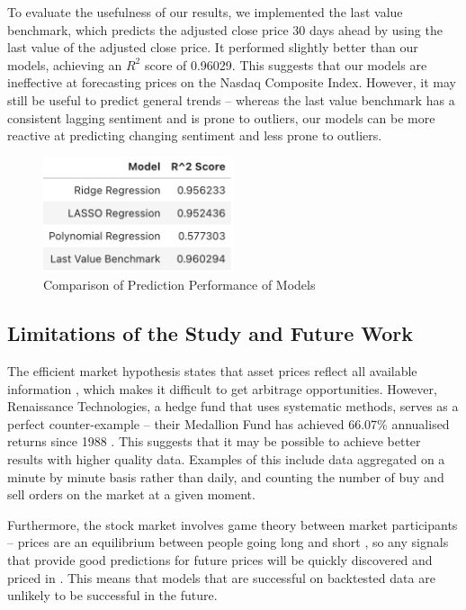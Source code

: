 \documentclass[a4paper, 11pt]{article}
\begin{document}
To evaluate the usefulness of our results, we implemented the last value benchmark, which predicts the adjusted close price 30 days ahead by using the last value of the adjusted close price. It performed slightly better than our models, achieving an $R^2$ score of 0.96029. This suggests that our models are ineffective at forecasting prices on the Nasdaq Composite Index. However, it may still be useful to predict general trends -- whereas the last value benchmark has a consistent lagging sentiment and is prone to outliers, our models can be more reactive at predicting changing sentiment and less prone to outliers.

\begin{figure}[H]
    \begin{center}
        \includegraphics[width=0.5\textwidth]{Model Results Table.png}
        \caption{Comparison of Prediction Performance of Models}
    \end{center}
\end{figure}

\subsection{Limitations of the Study and Future Work}
The efficient market hypothesis states that asset prices reflect all available information \cite{fama1970efficient}, which makes it difficult to get arbitrage opportunities. However, Renaissance Technologies, a hedge fund that uses systematic methods, serves as a perfect counter-example -- their Medallion Fund has achieved 66.07\% annualised returns since 1988 \cite{cornell2020medallion}. This suggests that it may be possible to achieve better results with higher quality data. Examples of this include data aggregated on a minute by minute basis rather than daily, and counting the number of buy and sell orders on the market at a given moment.

Furthermore, the stock market involves game theory between market participants \cite{allen1998finance} -- prices are an equilibrium between people going long and short \cite{thakor1991game}, so any signals that provide good predictions for future prices will be quickly discovered and priced in \cite{carfi2011fair}. This means that models that are successful on backtested data are unlikely to be successful in the future.
\end{document}
